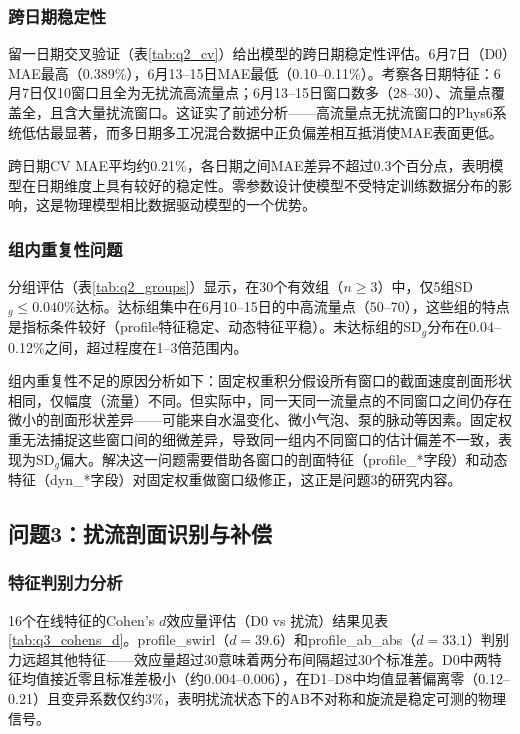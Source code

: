 \subsubsection{跨日期稳定性}

留一日期交叉验证（表\ref{tab:q2_cv}）给出模型的跨日期稳定性评估。6月7日（D0）MAE最高（0.389\%），6月13--15日MAE最低（0.10--0.11\%）。考察各日期特征：6月7日仅10窗口且全为无扰流高流量点；6月13--15日窗口数多（28--30）、流量点覆盖全，且含大量扰流窗口。这证实了前述分析——高流量点无扰流窗口的Phys6系统低估最显著，而多日期多工况混合数据中正负偏差相互抵消使MAE表面更低。

跨日期CV MAE平均约0.21\%，各日期之间MAE差异不超过0.3个百分点，表明模型在日期维度上具有较好的稳定性。零参数设计使模型不受特定训练数据分布的影响，这是物理模型相比数据驱动模型的一个优势。

\subsubsection{组内重复性问题}

分组评估（表\ref{tab:q2_groups}）显示，在30个有效组（$n \ge 3$）中，仅5组SD$_g \le 0.040\%$达标。达标组集中在6月10--15日的中高流量点（50--70），这些组的特点是指标条件较好（profile特征稳定、动态特征平稳）。未达标组的SD$_g$分布在0.04--0.12\%之间，超过程度在1--3倍范围内。

组内重复性不足的原因分析如下：固定权重积分假设所有窗口的截面速度剖面形状相同，仅幅度（流量）不同。但实际中，同一天同一流量点的不同窗口之间仍存在微小的剖面形状差异——可能来自水温变化、微小气泡、泵的脉动等因素。固定权重无法捕捉这些窗口间的细微差异，导致同一组内不同窗口的估计偏差不一致，表现为SD$_g$偏大。解决这一问题需要借助各窗口的剖面特征（profile\_*字段）和动态特征（dyn\_*字段）对固定权重做窗口级修正，这正是问题3的研究内容。

\subsection{问题3：扰流剖面识别与补偿}

\subsubsection{特征判别力分析}

16个在线特征的Cohen's $d$效应量评估（D0 vs 扰流）结果见表\ref{tab:q3_cohens_d}。profile\_swirl（$d=39.6$）和profile\_ab\_abs（$d=33.1$）判别力远超其他特征——效应量超过30意味着两分布间隔超过30个标准差。D0中两特征均值接近零且标准差极小（约0.004--0.006），在D1--D8中均值显著偏离零（0.12--0.21）且变异系数仅约3\%，表明扰流状态下的AB不对称和旋流是稳定可测的物理信号。

